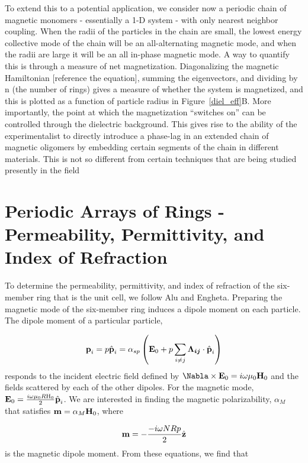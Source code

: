\documentclass[journal=apchd5,manuscript=article]{achemso}
\begin{document}
To extend this to a potential application, we consider now a periodic chain of magnetic monomers - essentially a 1-D system - with only nearest neighbor coupling. When the radii of the particles in the chain are small, the lowest energy collective mode of the chain will be an all-alternating magnetic mode, and when the radii are large it will be an all in-phase magnetic mode. A way to quantify this is through a measure of net magnetization. Diagonalizing the magnetic Hamiltonian [reference the equation], summing the eigenvectors, and dividing by n (the number of rings) gives a measure of whether the system is magnetized, and this is plotted as a function of particle radius in Figure~\ref{diel_eff}B. More importantly, the point at which the magnetization ``switches on'' can be controlled through the dielectric background. This gives rise to the ability of the experimentalist to directly introduce a phase-lag in an extended chain of magnetic oligomers by embedding certain segments of the chain in different materials. This is not so different from certain techniques that are being studied presently in the field\cite{odom_lasing}

\section{Periodic Arrays of Rings - Permeability, Permittivity, and Index of Refraction}
To determine the permeability, permittivity, and index of refraction of the six-member ring that is the unit cell, we follow Alu and Engheta\cite{Alu2006}. Preparing the magnetic mode of the six-member ring induces a dipole moment on each particle. The dipole moment of a particular particle,

\begin{equation}
\textrm{\textbf{p}}_{i} = p\hat{\textrm{\textbf{p}}}_{i} = \alpha_{sp}\left(\textrm{\textbf{E}}_{0} + p\sum_{i\neq j}\boldsymbol{\Lambda_{ij}}\cdot\hat{\textrm{\textbf{p}}}_{i}\right)
\label{dipolemoment}
\end{equation} 
 responds to the incident electric field defined by $\Nabla \times \textrm{\textbf{E}}_{0} = i\omega\mu_{0}\textrm{\textbf{H}}_{0}$ and the fields scattered by each of the other dipoles. For the magnetic mode, $\textrm{\textbf{E}}_{0} = \frac{i\omega\mu_{0}R\textrm{H}_{0}}{2}\hat{\textrm{\textbf{p}}}_{i}$. We are interested in finding the magnetic polarizability, $\alpha_{M}$ that satisfies $\textrm{\textbf{m}} = \alpha_{M}\textrm{\textbf{H}}_{0}$, where

\begin{equation}
\textrm{\textbf{m}} = -\frac{-i\omega NRp}{2}\hat{\textrm{\textbf{z}}}
\label{magneticmoment}
\end{equation}
is the magnetic dipole moment. From these equations, we find that
\end{document}
